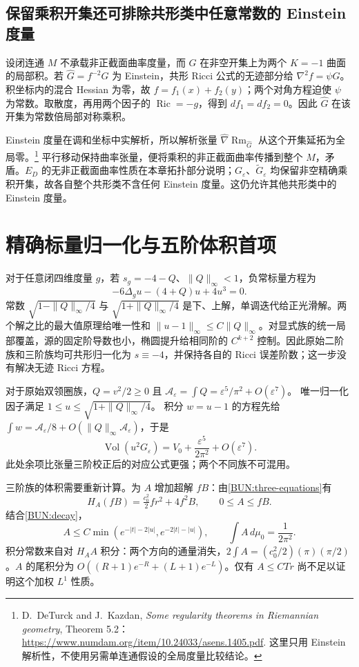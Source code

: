 \documentclass[UTF8,fontset=fandol,zihao=-4,oneside,openany]{ctexbook}
\theoremstyle{cjkplain}
\numberwithin{equation}{chapter}
\begin{document}
\subsection{保留乘积开集还可排除共形类中任意常数的 Einstein 度量}
设闭连通 $M$ 不承载非正截面曲率度量，而 $G$ 在非空开集上为两个 $K=-1$ 曲面的局部积。若 $\widehat G=f^{-2}G$ 为 Einstein，共形 Ricci 公式的无迹部分给 $\nabla^2f=\psi G$。积坐标内的混合 Hessian 为零，故 $f=f_1(x)+f_2(y)$；两个对角方程迫使 $\psi$ 为常数。取散度，再用两个因子的 $\operatorname{Ric}=-g$，得到 $df_1=df_2=0$。因此 $\widehat G$ 在该开集为常数倍局部对称乘积。

Einstein 度量在调和坐标中实解析，所以解析张量 $\widehat\nabla\operatorname{Rm}_{\widehat G}$ 从这个开集延拓为全局零。\footnote{D.~DeTurck and J.~Kazdan, \emph{Some regularity theorems in Riemannian geometry}, Theorem 5.2：\url{https://www.numdam.org/item/10.24033/asens.1405.pdf}. 这里只用 Einstein 解析性，不使用另需单连通假设的全局度量比较结论。}
平行移动保持曲率张量，便将乘积的非正截面曲率传播到整个 $M$，矛盾。$E_D$ 的无非正截面曲率性质在本章拓扑部分说明；$G_\varepsilon$、$\widetilde G_\varepsilon$ 均保留非空精确乘积开集，故各自整个共形类不含任何 Einstein 度量。这仍允许其他共形类中的 Einstein 度量。

\section{精确标量归一化与五阶体积首项}
\label{BUN:volume-expansion}

对于任意闭四维度量 $g$，若 $s_g=-4-Q$、$\|Q\|_\infty<1$，负常标量方程为
\[
 -6\Delta_gu-(4+Q)u+4u^3=0.
\]
常数 $\sqrt{1-\|Q\|_\infty/4}$ 与 $\sqrt{1+\|Q\|_\infty/4}$ 是下、上解，单调迭代给正光滑解。两个解之比的最大值原理给唯一性和 $\|u-1\|_\infty\le C\|Q\|_\infty$。对显式族的统一局部覆盖，源的固定阶导数也小，椭圆提升给相同阶的 $C^{k+2}$ 控制。因此原始二阶族和三阶族均可共形归一化为 $s\equiv-4$，并保持各自的 Ricci 误差阶数；这一步没有解决无迹 Ricci 方程。

对于原始双领圈族，$Q=v^2/2\ge0$ 且
$\mathcal A_\varepsilon=\int Q=\varepsilon^5/\pi^2+O(\varepsilon^7)$。
唯一归一化因子满足 $1\le u\le\sqrt{1+\|Q\|_\infty/4}$。
积分 $w=u-1$ 的方程先给
$\int w=\mathcal A_\varepsilon/8+O(\|Q\|_\infty\mathcal A_\varepsilon)$，于是
\[
 \operatorname{Vol}(u^2G_\varepsilon)
 =V_0+\frac{\varepsilon^5}{2\pi^2}+O(\varepsilon^7).
\]
此处余项比张量三阶校正后的对应公式更强；两个不同族不可混用。

三阶族的体积需要重新计算。为 $A$ 增加超解 $fB$：由\eqref{BUN:three-equations}有
\[
 H_A(fB)=\tfrac{c_0^2}{2}fr^2+4f^2B,
 \qquad 0\le A\le fB.
\]
结合\eqref{BUN:decay}，
\[
 A\le C\min(e^{-|t|-2|u|},e^{-2|t|-|u|}),
 \qquad \int A\,d\mu_0=\frac1{2\pi^2}.
\]
积分常数来自对 $H_AA$ 积分：两个方向的通量消失，$2\int A=(c_0^2/2)(\pi)(\pi/2)$。$A$ 的尾积分为
$O((R+1)e^{-R}+(L+1)e^{-L})$。仅有 $A\le CTr$ 尚不足以证明这个加权 $L^1$ 性质。
\end{document}
